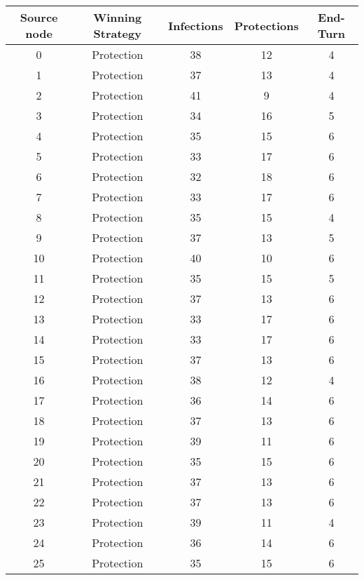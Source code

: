 \documentclass[results.tex]{subfiles}
\begin{document}
\begin{center}
  \begin{tabular}{| c || c | c | c | c |}
    \hline
    {\bfseries Source node} & {\bfseries Winning Strategy} & {\bfseries Infections} & {\bfseries Protections} & {\bfseries End-Turn} \\  %
    \hline\hline
    0 & Protection & 38 & 12 & 4 \\ 
    \hline
    1 & Protection & 37 & 13 & 4 \\ 
    \hline
    2 & Protection & 41 & 9 & 4 \\ 
    \hline
    3 & Protection & 34 & 16 & 5 \\ 
    \hline
    4 & Protection & 35 & 15 & 6 \\ 
    \hline
    5 & Protection & 33 & 17 & 6 \\ 
    \hline
    6 & Protection & 32 & 18 & 6 \\ 
    \hline
    7 & Protection & 33 & 17 & 6 \\ 
    \hline
    8 & Protection & 35 & 15 & 4 \\ 
    \hline
    9 & Protection & 37 & 13 & 5 \\ 
    \hline
    10 & Protection & 40 & 10 & 6 \\ 
    \hline
    11 & Protection & 35 & 15 & 5 \\ 
    \hline
    12 & Protection & 37 & 13 & 6 \\ 
    \hline
    13 & Protection & 33 & 17 & 6 \\ 
    \hline
    14 & Protection & 33 & 17 & 6 \\ 
    \hline
    15 & Protection & 37 & 13 & 6 \\ 
    \hline
    16 & Protection & 38 & 12 & 4 \\ 
    \hline
    17 & Protection & 36 & 14 & 6 \\ 
    \hline
    18 & Protection & 37 & 13 & 6 \\ 
    \hline
    19 & Protection & 39 & 11 & 6 \\ 
    \hline
    20 & Protection & 35 & 15 & 6 \\ 
    \hline
    21 & Protection & 37 & 13 & 6 \\ 
    \hline
    22 & Protection & 37 & 13 & 6 \\ 
    \hline
    23 & Protection & 39 & 11 & 4 \\ 
    \hline
    24 & Protection & 36 & 14 & 6 \\ 
    \hline
    25 & Protection & 35 & 15 & 6 \\ 

\end{tabular}
\end{center}
\end{document}
